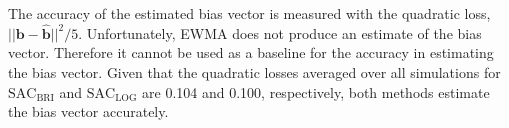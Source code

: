 \documentclass[aoas, preprint]{imsart}
\numberwithin{equation}{section}
\theoremstyle{plain}
\begin{document}

%
%
%
%

%
%
%
%
%
%
The accuracy of the estimated bias vector is measured with the quadratic loss, $|| \boldsymbol{b} - \hat{\boldsymbol{b}}||^2/5$. 
Unfortunately, EWMA does not produce an estimate of the bias vector. Therefore it cannot be used as a baseline for the accuracy in estimating the bias vector.  Given that the quadratic losses averaged over all simulations for $\text{SAC}_{\text{BRI}}$ and $\text{SAC}_{\text{LOG}}$ are 0.104 and 0.100, respectively, both methods estimate the bias vector accurately. 
\end{document}
